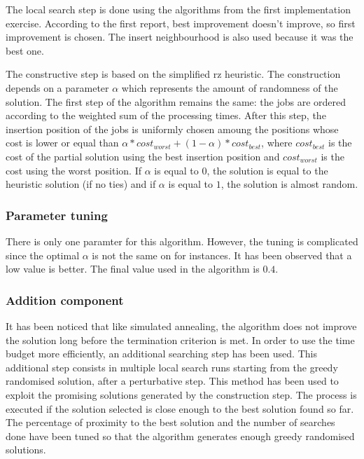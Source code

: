 \documentclass{article}
\begin{document}
The local search step is done using the algorithms from the first implementation exercise.
According to the first report, best improvement doesn't improve, so first improvement is chosen.
The insert neighbourhood is also used because it was the best one.\newline

The constructive step is based on the simplified rz heuristic.
The construction depends on a parameter $\alpha$ which represents the amount of randomness of the solution.
The first step of the algorithm remains the same: the jobs are ordered according to the weighted sum of the processing times.
After this step, the insertion position of the jobs is uniformly chosen amoung the positions whose cost is lower or equal than $\alpha*cost_{worst} + (1-\alpha)*cost_{best}$, where $cost_{best}$ is the cost of the partial solution using the best insertion position and $cost_{worst}$ is the cost using the worst position.
If $\alpha$ is equal to $0$, the solution is equal to the heuristic solution (if no ties) and if $\alpha$ is equal to $1$, the solution is almost random.

\subsubsection{Parameter tuning}

There is only one paramter for this algorithm.
However, the tuning is complicated since the optimal $\alpha$ is not the same on for instances.
It has been observed that a low value is better.
The final value used in the algorithm is $0.4$.

\subsubsection{Addition component}

It has been noticed that like simulated annealing, the algorithm does not improve the solution long before the termination criterion is met.
In order to use the time budget more efficiently, an additional searching step has been used.
This additional step consists in multiple local search runs starting from the greedy randomised solution, after a perturbative step.
This method has been used to exploit the promising solutions generated by the construction step.
The process is executed if the solution selected is close enough to the best solution found so far.
The percentage of proximity to the best solution and the number of searches done have been tuned so that the algorithm generates enough greedy randomised solutions.\newline
\end{document}
